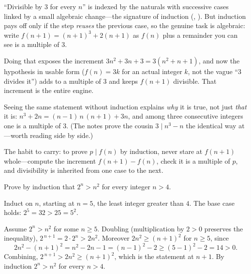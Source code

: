\documentclass[main.tex]{subfiles}
\begin{document}
\begin{Reflection}
``Divisible by $3$ for every $n$'' is indexed by the naturals with successive cases linked by a small
algebraic change---the signature of induction (, ). But induction pays off
only if the step \emph{reuses} the previous case, so the genuine task is algebraic: write
$f(n+1)=(n+1)^3+2(n+1)$ as $f(n)$ plus a remainder you can see is a multiple of $3$.

Doing that exposes the increment $3n^2+3n+3=3(n^2+n+1)$, and now the hypothesis in usable form
($f(n)=3k$ for an actual integer $k$, not the vague ``$3$ divides it'') adds to a multiple of $3$ and
keeps $f(n+1)$ divisible. That increment is the entire engine.

Seeing the same statement without induction explains \emph{why} it is true, not just \emph{that} it is:
$n^3+2n=(n-1)\,n\,(n+1)+3n$, and among three consecutive integers one is a multiple of $3$. (The notes
prove the cousin $3\mid n^3-n$ the identical way at ---worth reading side by side.)

The habit to carry: to prove $p\mid f(n)$ by induction, never stare at $f(n+1)$ whole---compute the
increment $f(n+1)-f(n)$, check it is a multiple of $p$, and divisibility is inherited from one case to
the next.
\end{Reflection}

Prove by induction that $2^n>n^2$ for every integer $n>4$.

\begin{Solution}
Induct on $n$, starting at $n=5$, the least integer greater than $4$. The base case holds:
$2^5=32>25=5^2$.

Assume $2^n>n^2$ for some $n\ge 5$. Doubling (multiplication by $2>0$ preserves the inequality),
$2^{\,n+1}=2\cdot 2^n>2n^2$. Moreover $2n^2\ge(n+1)^2$ for $n\ge 5$, since
\[
2n^2-(n+1)^2=n^2-2n-1=(n-1)^2-2\ge(5-1)^2-2=14>0.
\]
Combining, $2^{\,n+1}>2n^2\ge(n+1)^2$, which is the statement at $n+1$. By induction $2^n>n^2$ for
every $n>4$.
\end{Solution}
\end{document}
